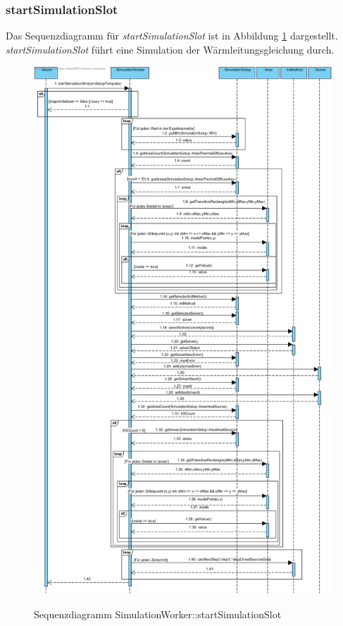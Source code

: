 \subsubsection*{startSimulationSlot}

Das Sequenzdiagramm für \emph{startSimulationSlot} ist in Abbildung \ref{Sequenzdiagramm SimulationWorker::startSimulationSlot} dargestellt. \emph{startSimulationSlot} führt eine Simulation der Wärmleitungsgleichung durch.

\begin{figure}[H]
	\centering
	\includegraphics[scale=.4]{Bilder/SimulationWorker__startSimulationSlot().jpg}\\
	\caption{Sequenzdiagramm SimulationWorker::startSimulationSlot}
	\label{Sequenzdiagramm SimulationWorker::startSimulationSlot}
\end{figure}

